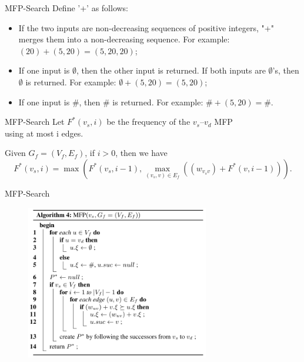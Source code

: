 \documentclass[mathserif]{beamer}
\begin{document}
\begin{frame}{MFP-Search}
Define '+' as follows:
\begin{itemize}
\item If the two inputs are non-decreasing sequences of positive integers, "+" merges them into a non-decreasing sequence. For example: $(20) + (5, 20) = (5, 20, 20)$;
\item If one input is $\emptyset{}$, then the other input is returned. If both inputs are $\emptyset{}$’s, then $\emptyset{}$ is returned. For example: $\emptyset{} + (5, 20) = (5, 20)$;
\item If one input is $\#$, then $\#$ is returned. For example: $\# + (5, 20) = \#$.
\end{itemize}
\end{frame}

\begin{frame}{MFP-Search}
Let $F^*(v_s, i)$ be the frequency of the $v_s–v_d$ MFP\\ using at most i edges.
\begin{lemm}
Given $G_f = (V_f,E_f)$, if $i > 0$, then we have
\begin{displaymath}
F^*(v_s,i) = \max(F^*(v_s,i−1), \max_{(v_s,v) \in{} E_f} ((w_{v_sv})+F^*(v,i−1))).
\end{displaymath}
\end{lemm}
\end{frame}

\begin{frame}{MFP-Search}
\begin{figure}
\includegraphics[width = 8cm]{alg4.png}
\end{figure}
\end{frame}
\end{document}
